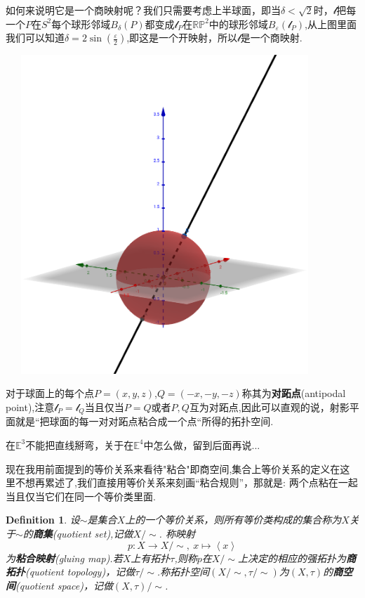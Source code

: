 \documentclass{article}
\newtheorem{definition}[theorem]{Definition}
\newcommand*{\xfunc}[4]{{#2}\colon{#3}{#1}{#4}}
\newcommand*{\func}[3]{\xfunc{\to}{#1}{#2}{#3}}
\begin{document}
如何来说明它是一个商映射呢？我们只需要考虑上半球面，即当$\delta < \sqrt{2}$时，$\mathcal{l}$把每一个$P$在$S^2$每个球形邻域$B_\delta(P)$都变成$\mathcal{l}_P$在$\mathbb{R}\mathbb{P}^2$中的球形邻域$B_\varepsilon(\mathcal{l}_P)$,从上图里面我们可以知道$\delta=2 \sin(\frac{\varepsilon}{2})$,即这是一个开映射，所以$\mathcal{l}$是一个商映射.

\begin{center}
\includegraphics[width=12cm, height=12cm]{images/antipodal_point.png}
\end{center}

对于球面上的每个点$P=(x,y,z)$,$Q=(-x,-y,-z)$称其为\textbf{对跖点}(antipodal point),注意$\mathcal{l}_P=\mathcal{l}_Q$当且仅当$P=Q$或者$P,Q$互为对跖点,因此可以直观的说，射影平面就是“把球面的每一对对跖点粘合成一个点“所得的拓扑空间.

在$\mathbb{E}^3$不能把直线掰弯，关于在$\mathbb{E}^4$中怎么做，留到后面再说...

现在我用前面提到的等价关系来看待"粘合"即商空间,集合上等价关系的定义在这里不想再累述了,我们直接用等价关系来刻画“粘合规则”，那就是: 两个点粘在一起当且仅当它们在同一个等价类里面. 

\begin{definition}
设$\sim$是集合$X$上的一个等价关系，则所有等价类构成的集合称为$X$关于$\sim$的\textbf{商集}(quotient set),记做$X / \sim$. 称映射\[\func{p}{X}{X / \sim},\ x \mapsto \left<x\right>\]为\textbf{粘合映射}(gluing map).若$X$上有拓扑$\tau$,则称$p$在$X / \sim$上决定的相应的强拓扑为\textbf{商拓扑}(quotient topology)，记做$\tau / \sim$.称拓扑空间$(X / \sim, \tau /\sim)$为$(X,\tau)$的\textbf{商空间}(quotient space)，记做$(X,\tau) / \sim$.
\end{definition}
\end{document}
